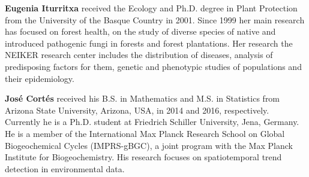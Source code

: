 \documentclass[remotesensing,article,submit,moreauthors,pdftex]{Definitions/mdpi}
\begin{document}
\bio
{}
{\textbf{Eugenia Iturritxa} received the Ecology and Ph.D. degree in Plant Protection from the University of the Basque Country in 2001.
	Since 1999 her main research has focused on forest health, on the study of diverse species of native and introduced pathogenic fungi in forests and forest plantations.
	Her research the NEIKER research center includes the distribution of diseases, analysis of predisposing factors for them, genetic and phenotypic studies of populations and their epidemiology.}

\bio
{}
{\textbf{José Cortés} received his B.S. in Mathematics and M.S. in Statistics from Arizona State University, Arizona, USA, in 2014 and 2016, respectively.
	Currently he is a Ph.D. student at Friedrich Schiller University, Jena, Germany.
	He is a member of the International Max Planck Research School on Global Biogeochemical Cycles (IMPRS-gBGC), a joint program with the Max Planck Institute for Biogeochemistry.
	His research focuses on spatiotemporal trend detection in environmental data.}
\end{document}
